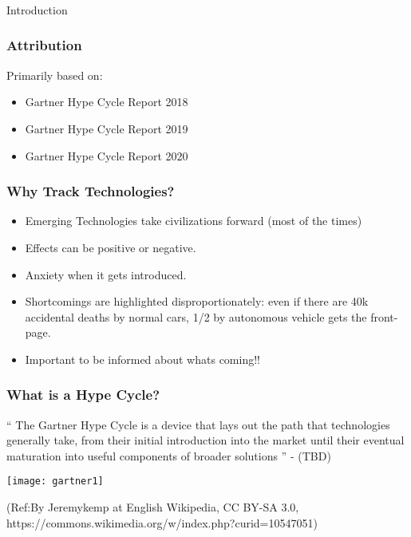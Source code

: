 \begin{frame}[fragile]\frametitle{}
\begin{center}
{\Large Introduction}
\end{center}
\end{frame}

\begin{frame}[fragile]\frametitle{Attribution}

Primarily based on:
\begin{itemize}
\item Gartner Hype Cycle Report 2018
\item Gartner Hype Cycle Report 2019
\item Gartner Hype Cycle Report 2020
\end{itemize}
\end{frame}


\begin{frame}[fragile]\frametitle{Why Track Technologies?}

\begin{itemize}
\item Emerging Technologies take civilizations forward (most of the times)
\item Effects can be positive or negative. 
\item Anxiety when it gets introduced.
\item Shortcomings are highlighted disproportionately: even if there are 40k accidental deaths by normal cars, 1/2 by autonomous vehicle gets the front-page.
\item Important to be informed about whats coming!!
\end{itemize}
\end{frame}


\begin{frame}[fragile]\frametitle{What is a Hype Cycle?}

`` The Gartner Hype Cycle is a device that lays out the path that technologies generally take, from their initial introduction into the market until their eventual maturation into useful components of broader solutions '' - (TBD)


\begin{center}
\texttt{[image: gartner1]}
\end{center}

{\tiny (Ref:By Jeremykemp at English Wikipedia, CC BY-SA 3.0, https://commons.wikimedia.org/w/index.php?curid=10547051)}

\end{frame}

